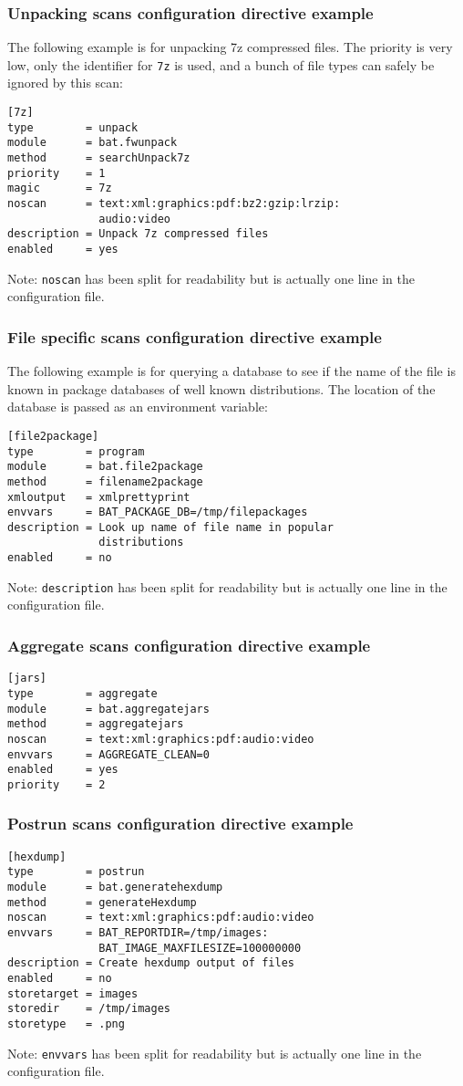 \documentclass[11pt]{beamer}
\begin{document}
\begin{frame}[fragile]
\frametitle{Unpacking scans configuration directive example}

The following example is for unpacking 7z compressed files. The priority is very low, only the identifier for \texttt{7z} is used, and a bunch of file types can safely be ignored by this scan:

\begin{verbatim}
[7z]
type        = unpack
module      = bat.fwunpack
method      = searchUnpack7z
priority    = 1
magic       = 7z
noscan      = text:xml:graphics:pdf:bz2:gzip:lrzip:
              audio:video
description = Unpack 7z compressed files
enabled     = yes
\end{verbatim}

Note: \texttt{noscan} has been split for readability but is actually one line in the configuration file.
\end{frame}

\begin{frame}[fragile]
\frametitle{File specific scans configuration directive example}
The following example is for querying a database to see if the name of the file is known in package databases of well known distributions. The location of the database is passed as an environment variable:

\begin{verbatim}
[file2package]
type        = program
module      = bat.file2package
method      = filename2package
xmloutput   = xmlprettyprint
envvars     = BAT_PACKAGE_DB=/tmp/filepackages
description = Look up name of file name in popular
              distributions
enabled     = no
\end{verbatim}
Note: \texttt{description} has been split for readability but is actually one line in the configuration file.
\end{frame}

\begin{frame}[fragile]
\frametitle{Aggregate scans configuration directive example}
\begin{verbatim}
[jars]
type        = aggregate
module      = bat.aggregatejars
method      = aggregatejars
noscan      = text:xml:graphics:pdf:audio:video
envvars     = AGGREGATE_CLEAN=0
enabled     = yes
priority    = 2
\end{verbatim}
\end{frame}

\begin{frame}[fragile]
\frametitle{Postrun scans configuration directive example}
\begin{verbatim}
[hexdump]
type        = postrun
module      = bat.generatehexdump
method      = generateHexdump
noscan      = text:xml:graphics:pdf:audio:video
envvars     = BAT_REPORTDIR=/tmp/images:
              BAT_IMAGE_MAXFILESIZE=100000000
description = Create hexdump output of files
enabled     = no
storetarget = images
storedir    = /tmp/images
storetype   = .png
\end{verbatim}

Note: \texttt{envvars} has been split for readability but is actually one line in the configuration file.
\end{frame}
\end{document}

